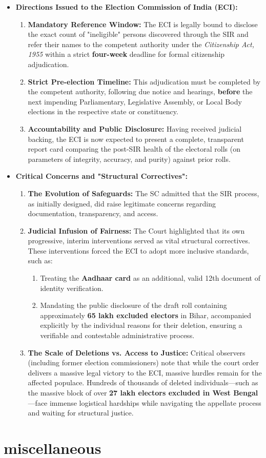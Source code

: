\begin{itemize}
    \item \textbf{Directions Issued to the Election Commission of India (ECI):}
    \begin{enumerate}
        \item \textbf{Mandatory Reference Window:} The ECI is legally bound to disclose the exact count of "ineligible" persons discovered through the SIR and refer their names to the competent authority under the \textit{Citizenship Act, 1955} within a strict \textbf{four-week} deadline for formal citizenship adjudication.
        \item \textbf{Strict Pre-election Timeline:} This adjudication must be completed by the competent authority, following due notice and hearings, \textbf{before} the next impending Parliamentary, Legislative Assembly, or Local Body elections in the respective state or constituency.
        \item \textbf{Accountability and Public Disclosure:} Having received judicial backing, the ECI is now expected to present a complete, transparent report card comparing the post-SIR health of the electoral rolls (on parameters of integrity, accuracy, and purity) against prior rolls.
    \end{enumerate}

    \item \textbf{Critical Concerns and "Structural Correctives":}
    \begin{enumerate}
        \item \textbf{The Evolution of Safeguards:} The SC admitted that the SIR process, as initially designed, did raise legitimate concerns regarding documentation, transparency, and access. 
        \item \textbf{Judicial Infusion of Fairness:} The Court highlighted that its own progressive, interim interventions served as vital structural correctives. These interventions forced the ECI to adopt more inclusive standards, such as:
        \begin{enumerate}
            \item Treating the \textbf{Aadhaar card} as an additional, valid 12th document of identity verification.
            \item Mandating the public disclosure of the draft roll containing approximately \textbf{65 lakh excluded electors} in Bihar, accompanied explicitly by the individual reasons for their deletion, ensuring a verifiable and contestable administrative process.
        \end{enumerate}
        \item \textbf{The Scale of Deletions vs. Access to Justice:} Critical observers (including former election commissioners) note that while the court order delivers a massive legal victory to the ECI, massive hurdles remain for the affected populace. Hundreds of thousands of deleted individuals—such as the massive block of over \textbf{27 lakh electors excluded in West Bengal}—face immense logistical hardships while navigating the appellate process and waiting for structural justice.
    \end{enumerate}
\end{itemize}
\section{miscellaneous}

\clearpage 

